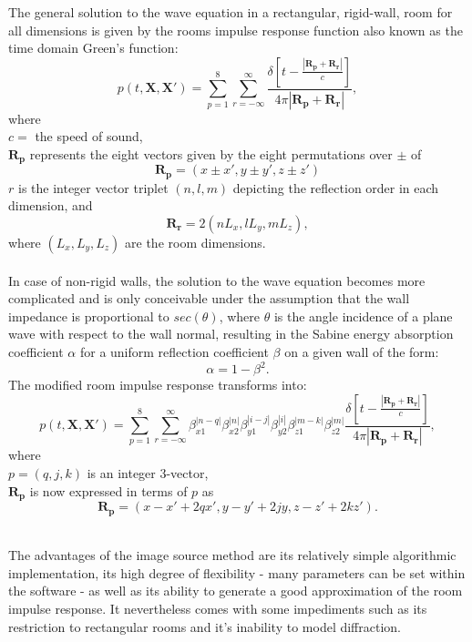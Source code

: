 The general solution to the wave equation in a rectangular, rigid-wall, room for all dimensions is given by the rooms impulse response function also known as the time domain Green's function\cite{Allen1979}:
\begin{equation}
    p(t,\mathbf{X},\mathbf{X'})=\sum_{p=1}^8\sum_{r=-\infty}^\infty\frac{\delta[t-\frac{|\mathbf{R_p}+\mathbf{R_r}|}{c}]}{4\pi|\mathbf{R_p}+\mathbf{R_r}|},
\end{equation}
where\\ 
$c=$ the speed of sound,\\
$\mathbf{R_p}$ represents the eight vectors given by the eight permutations over $\pm$ of
\begin{equation}
    \mathbf{R_p}=(x\pm x', y\pm y', z\pm z')
\end{equation}
$r$ is the integer vector triplet $(n,l,m)$ depicting the reflection order in each dimension, and
\begin{equation}
    \mathbf{R_r}=2(nL_x, lL_y, mL_z),
\end{equation}
where $(L_x, L_y, L_z)$ are the room dimensions.
\\
\\
In case of non-rigid walls, the solution to the wave equation becomes more complicated and is only conceivable under the assumption that the wall impedance is proportional to $sec(\theta)$, where $\theta$ is the angle incidence of a plane wave with respect to the wall normal, resulting in the Sabine energy absorption coefficient $\alpha$ for a uniform reflection coefficient $\beta$ on a given wall of the form\cite{Allen1979}:
\begin{equation}
    \alpha=1-\beta^2.
\end{equation}
The modified room impulse response transforms into:
\begin{equation}
    p(t,\mathbf{X},\mathbf{X'})=\sum_{p=1}^8\sum_{r=-\infty}^\infty
    \beta_{x1}^{|n-q|}\beta_{x2}^{|n|}\beta_{y1}^{|i-j|}\beta_{y2}^{|i|}\beta_{z1}^{|m-k|}\beta_{z2}^{|m|}
    \frac{\delta[t-\frac{|\mathbf{R_p}+\mathbf{R_r}|}{c}]}{4\pi|\mathbf{R_p}+\mathbf{R_r}|},
\end{equation}
where\\
$p=(q,j,k)$ is an integer 3-vector,\\
$\mathbf{R_p}$ is now expressed in terms of $p$ as
\begin{equation}
    \mathbf{R_p}=(x-x'+2qx', y-y'+2jy,z-z'+2kz').
\end{equation}

\\The advantages of the image source method are its relatively simple algorithmic implementation, its high degree of flexibility - many parameters can be set within the software - as well as its ability to generate a good approximation of the room impulse response. It nevertheless comes with some impediments such as its restriction to rectangular rooms and it's inability to model diffraction.\cite{Samarasinghe2018}


